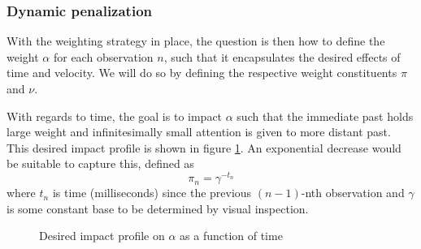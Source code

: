 \subsubsection{Dynamic penalization}


With the weighting strategy in place, the question is then how to define the weight $\alpha$ for each observation $n$, such that it encapsulates the desired effects of time and velocity. We will do so by defining the respective weight constituents $\pi$ and $\nu$.


With regards to time, the goal is to impact $\alpha$ such that the immediate past holds large weight and infinitesimally small attention is given to more distant past. This desired impact profile is shown in figure \ref{fig:alphaTime}. An exponential decrease would be suitable to capture this, defined as 
 $$\pi_n = \gamma^{-t_n} $$
where $t_n$ is time (milliseconds) since the previous $(n-1)$-nth observation  and  $\gamma$ is some constant base to be determined by visual inspection.


\begin{figure}[!ht]
	\begin{center}
		\caption{Desired impact profile on $\alpha$ as a function of time}
		\label{fig:alphaTime}
	\end{center}
\end{figure}



